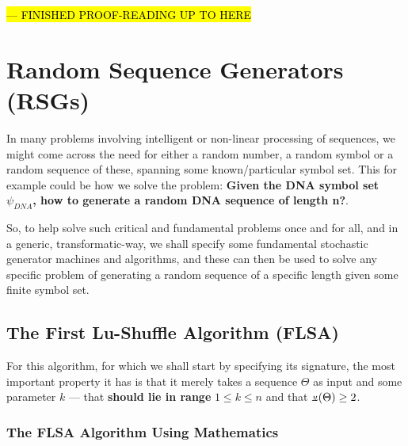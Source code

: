 \documentclass[a4paper, 18pt]{book} %
\newcommand{\invpi}{\rotatebox[origin=c]{180}{$\pi$}}
\begin{document}
\hl{--- FINISHED PROOF-READING UP TO HERE}



\chapter{Random Sequence Generators (RSGs)}
\label{SECRSG}


In many problems involving intelligent or non-linear processing of sequences, we might come across the need for either a random number, a random symbol or a random sequence of these, spanning some known/particular symbol set. This for example could be how we solve the problem: \textbf{Given the DNA symbol set $\psi_{DNA}$, how to generate a random DNA sequence of length n?}.

So, to help solve such critical and fundamental problems once and for all, and in a generic, transformatic-way, we shall specify some fundamental stochastic generator machines and algorithms, and these can then be used to solve any specific problem of generating a random sequence of a specific length given some finite symbol set.

\section{The First Lu-Shuffle Algorithm (FLSA)}

For this algorithm, for which we shall start by specifying its signature, the most important property it has is that it merely takes a sequence $\Theta$ as input and some parameter $k$ --- that \textbf{should lie in range} $1 \leq k \leq n$ and that $\invpi(\Theta) \geq 2$.

\subsection{The FLSA Algorithm Using Mathematics}
\end{document}

